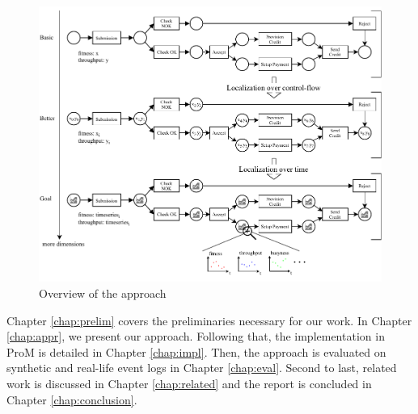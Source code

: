 \begin{figure}
    \centering
    \includegraphics[width=\textwidth]{figures/introduction/bigschematic.pdf}
    \caption{Overview of the approach}
    \label{fig:bigschematic}
\end{figure}

Chapter \ref{chap:prelim} covers the preliminaries necessary for our work. In Chapter \ref{chap:appr}, we present our approach. Following that, the implementation in ProM is detailed in Chapter \ref{chap:impl}. Then, the approach is evaluated on synthetic and real-life event logs in Chapter \ref{chap:eval}. Second to last, related work is discussed in Chapter \ref{chap:related} and the report is concluded in Chapter \ref{chap:conclusion}.